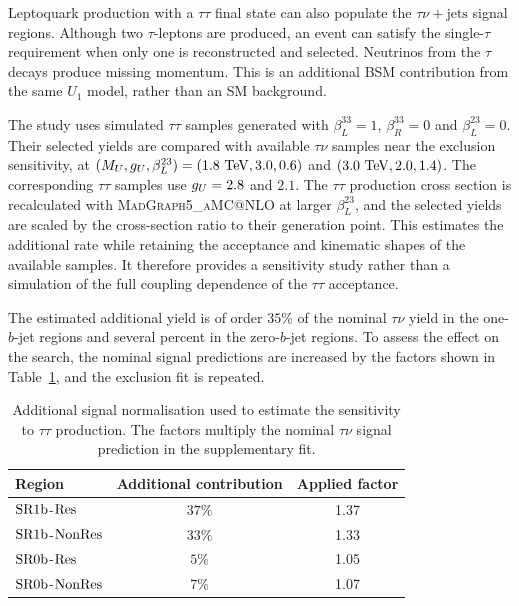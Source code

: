Leptoquark production with a $\tau\tau$ final state can also populate the $\tau\nu+\mathrm{jets}$ signal regions.
Although two $\tau$-leptons are produced, an event can satisfy the single-$\tau$ requirement when only one is reconstructed and selected.
Neutrinos from the $\tau$ decays produce missing momentum.
This is an additional BSM contribution from the same $U_1$ model, rather than an SM background.

The study uses simulated $\tau\tau$ samples generated with $\beta_L^{33}=1$, $\beta_R^{33}=0$ and $\beta_L^{23}=0$.
Their selected yields are compared with available $\tau\nu$ samples near the exclusion sensitivity, at $(M_U,g_U,\beta_L^{23})=(1.8~\mathrm{TeV},3.0,0.6)$ and $(3.0~\mathrm{TeV},2.0,1.4)$.
The corresponding $\tau\tau$ samples use $g_U=2.8$ and $2.1$.
The $\tau\tau$ production cross section is recalculated with \textsc{MadGraph5\_aMC@NLO} at larger $\beta_L^{23}$, and the selected yields are scaled by the cross-section ratio to their generation point.
This estimates the additional rate while retaining the acceptance and kinematic shapes of the available samples.
It therefore provides a sensitivity study rather than a simulation of the full coupling dependence of the $\tau\tau$ acceptance.

The estimated additional yield is of order $35\%$ of the nominal $\tau\nu$ yield in the one-$b$-jet regions and several percent in the zero-$b$-jet regions.
To assess the effect on the search, the nominal signal predictions are increased by the factors shown in Table~\ref{tab:ch7_tautau_contamination}, and the exclusion fit is repeated.

\begin{table}[htbp]
    \centering
    \caption{Additional signal normalisation used to estimate the sensitivity to $\tau\tau$ production. The factors multiply the nominal $\tau\nu$ signal prediction in the supplementary fit.}
    \label{tab:ch7_tautau_contamination}
    \begin{tabular}{lcc}
        \toprule
        Region & Additional contribution & Applied factor \\
        \midrule
        $\mathrm{SR1b}$-$\mathrm{Res}$ & $37\%$ & 1.37 \\
        $\mathrm{SR1b}$-$\mathrm{NonRes}$ & $33\%$ & 1.33 \\
        $\mathrm{SR0b}$-$\mathrm{Res}$ & $5\%$ & 1.05 \\
        $\mathrm{SR0b}$-$\mathrm{NonRes}$ & $7\%$ & 1.07 \\
        \bottomrule
    \end{tabular}
\end{table}

